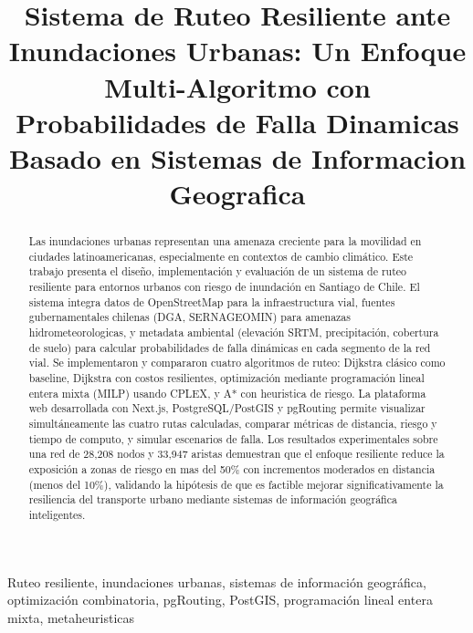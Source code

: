 \documentclass[conference]{IEEEtran}
\begin{document}
\title{Sistema de Ruteo Resiliente ante Inundaciones Urbanas: Un Enfoque Multi-Algoritmo con Probabilidades de Falla Dinamicas Basado en Sistemas de Informacion Geografica}

\author{
}

\maketitle

\begin{abstract}
Las inundaciones urbanas representan una amenaza creciente para la movilidad en ciudades latinoamericanas, especialmente en contextos de cambio climático. Este trabajo presenta el diseño, implementación y evaluación de un sistema de ruteo resiliente para entornos urbanos con riesgo de inundación en Santiago de Chile. El sistema integra datos de OpenStreetMap para la infraestructura vial, fuentes gubernamentales chilenas (DGA, SERNAGEOMIN) para amenazas hidrometeorologicas, y metadata ambiental (elevación SRTM, precipitación, cobertura de suelo) para calcular probabilidades de falla dinámicas en cada segmento de la red vial. Se implementaron y compararon cuatro algoritmos de ruteo: Dijkstra clásico como baseline, Dijkstra con costos resilientes, optimización mediante programación lineal entera mixta (MILP) usando CPLEX, y A* con heuristica de riesgo. La plataforma web desarrollada con Next.js, PostgreSQL/PostGIS y pgRouting permite visualizar simultáneamente las cuatro rutas calculadas, comparar métricas de distancia, riesgo y tiempo de computo, y simular escenarios de falla. Los resultados experimentales sobre una red de 28,208 nodos y 33,947 aristas demuestran que el enfoque resiliente reduce la exposición a zonas de riesgo en mas del 50\% con incrementos moderados en distancia (menos del 10\%), validando la hipótesis de que es factible mejorar significativamente la resiliencia del transporte urbano mediante sistemas de información geográfica inteligentes.
\end{abstract}

\begin{IEEEkeywords}
Ruteo resiliente, inundaciones urbanas, sistemas de información geográfica, optimización combinatoria, pgRouting, PostGIS, programación lineal entera mixta, metaheuristicas
\end{IEEEkeywords}
\end{document}
